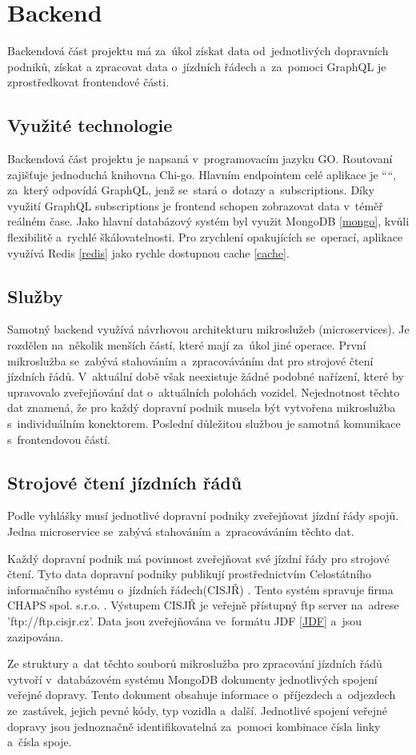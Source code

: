\newpage
\section{Backend}
Backendová část projektu má za~úkol získat data od~jednotlivých dopravních podniků, získat a zpracovat data o~jízdních řádech \cite{cisjr} a~za~pomoci GraphQL je zprostředkovat frontendové části.
\subsection{Využité technologie} Backendová část projektu je napsaná v~programovacím jazyku GO. Routovaní zajišťuje jednoduchá knihovna Chi-go. Hlavním endpointem celé aplikace je ““, za~který odpovídá GraphQL, jenž se~stará o~dotazy a~subscriptions. Díky využití GraphQL subscriptions je frontend schopen zobrazovat data v~téměř reálném čase. Jako hlavní databázový systém byl využit MongoDB \ref{mongo}, kvůli flexibilitě a~rychlé škálovatelnosti. Pro zrychlení opakujících se~operací, aplikace využívá Redis \ref{redis} jako rychle dostupnou cache \ref{cache}. \par
\subsection{Služby}
Samotný backend využívá návrhovou architekturu mikroslužeb (microservices). Je rozdělen na~několik menších částí, které mají za~úkol jiné operace. První mikroslužba se~zabývá stahováním a~zpracováváním dat pro strojové čtení jízdních řádů. V~aktuální době však neexistuje žádné podobné nařízení, které by upravovalo zveřejňování dat o~aktuálních polohách vozidel. Nejednotnost těchto dat znamená, že pro každý dopravní podnik musela být vytvořena mikroslužba s~individuálním konektorem. Poslední důležitou službou je samotná komunikace s~frontendovou částí.
\subsection [Jízdní řády]{Strojové čtení jízdních řádů} \label{strojoveCteniJR}
Podle vyhlášky \cite{vyhlaskaJizdniRady} musí jednotlivé dopravní podniky zveřejňovat jízdní řády spojů. Jedna microservice se~zabývá stahováním a~zpracováváním těchto dat. \par
Každý dopravní podnik má povinnost zveřejňovat své jízdní řády pro strojové čtení. Tyto data dopravní podniky publikují prostřednictvím Celostátního informačního systému o~jízdních řádech(CISJŘ) \cite{cisjr}. Tento systém spravuje firma CHAPS spol. s.r.o. \cite{chaps}. Výstupem CISJŘ je veřejně přístupný ftp server na~adrese 'ftp://ftp.cisjr.cz'. Data jsou zveřejňována ve~formátu JDF \ref{JDF} a~jsou zazipována. \par
Ze struktury a~dat těchto souborů mikroslužba pro zpracování jízdních řádů vytvoří v~databázovém systému MongoDB dokumenty jednotlivých spojení veřejné dopravy. Tento dokument obsahuje informace o~příjezdech a~odjezdech ze~zastávek, jejich pevné kódy, typ vozidla a~další. Jednotlivé spojení veřejné dopravy jsou jednoznačně identifikovatelná za~pomoci kombinace čísla linky a~čísla spoje.
